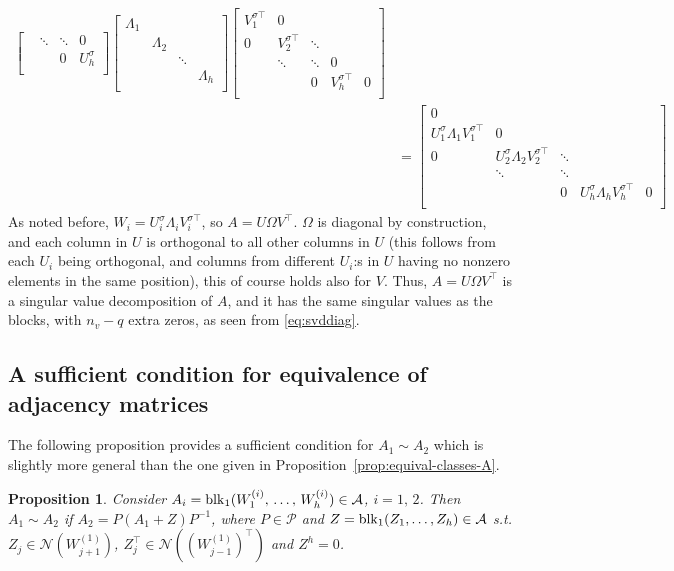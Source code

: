\documentclass{article}
\makeatletter
\renewenvironment{proof}[1][\proofname]{
  \par\pushQED{\qed}\normalfont
  \topsep6\p@\@plus6\p@\relax
  \trivlist\item[\hskip\labelsep\bfseries#1\@addpunct{.}]
  \ignorespaces
}{
  \popQED\endtrivlist\@endpefalse
}
\newtheorem{proposition}{Proposition}
\def\block{{\rm blk}}
\newcommand{\1}{\mathds{1}}
\makeatother
\begin{document}
\begin{proof}
\begin{align}
\begin{bmatrix}
		& \ddots & \ddots & 0\\
		& & 0 & U_h^\sigma \\
	\end{bmatrix}
	\begin{bmatrix}
		\Lambda_1 & & & \\
		& \Lambda_2 & & \\
		& & \ddots & \\
		& & & \Lambda_h \\
	\end{bmatrix}
	\begin{bmatrix}
		V_1^{\sigma \top} & 0 & & &  \\
		0 & V_2^{\sigma \top} & \ddots & & \\
		& \ddots & \ddots & 0 & \\
		& & 0 & V_h^{\sigma \top} & 0 \\
	\end{bmatrix} \nonumber \\
	& =\begin{bmatrix}
		0 & & & & \\
		U_1^\sigma \Lambda_1 V_1^{\sigma \top} & 0 & & & \\
		0 & U_2^\sigma \Lambda_2 V_2^{\sigma \top} & \ddots & & \\
		& \ddots & \ddots & & \\
		& & 0 & U_h^\sigma \Lambda_h V_h^{\sigma \top} & 0 \\
	\end{bmatrix}
\end{align}
As noted before, $W_i=U_i^\sigma \Lambda_iV_i^{\sigma \top}$, so $A=U\Omega V^\top $. $\Omega$ is diagonal by construction, and each column in $U$ is orthogonal to all other columns in $U$ (this follows from each $U_i$ being orthogonal, and columns from different $U_i$:s in $U$ having no nonzero elements in the same position), this of course holds also for $V$. Thus, $A=U\Omega V^\top $ is a singular value decomposition of $A$, and it has the same singular values as the blocks, with $n_v-q$ extra zeros, as seen from \eqref{eq:svddiag}.
\end{proof}



\subsection{A sufficient condition for equivalence of adjacency matrices}

The following proposition provides a sufficient condition for $ A_1 \sim A_2 $ which is slightly more general than the one given in Proposition~\ref{prop:equival-classes-A}. 
\begin{proposition}
\label{prop:equival-classes-power}
Consider $ A_i = \block_1 ( W_1^{(i)}, \, \ldots , \, W_h^{(i)})\in \mathcal{A}$, $i=1,\, 2$.
Then $ A_1 \sim A_2 $ if $ A_2 = P (A_1 + Z ) P^{-1} $, where $ P \in \mathcal{P} $ and $ Z =\block_1(Z_1, \ldots, Z_h ) \in \mathcal{A} $ s.t. $ Z_j \in \mathcal{N}(W_{j+1}^{(1)}) $, $ Z_j^\top \in \mathcal{N}((W_{j-1}^{(1)})^\top) $ and $ Z^h =0$.
\end{proposition}
\end{document}
